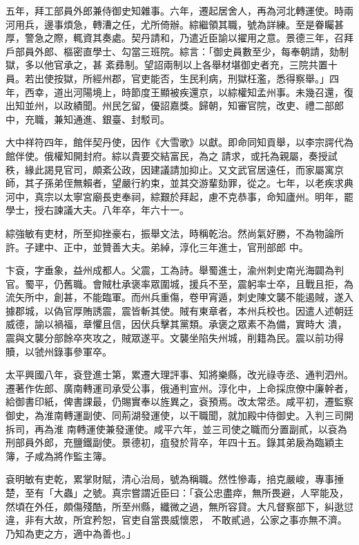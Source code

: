 \begin{pinyinscope}
 五年，拜工部員外郎兼侍御史知雜事。六年，遷起居舍人，再為河北轉運使。時兩河用兵，邊事煩急，轉漕之任，尤所倚辦。綜繼領其職，號為詳練。至是眷矚甚厚，警急之際，輒資其奏處。契丹請和，乃遣近臣諭以擢用之意。景德三年，召拜戶部員外郎、樞密直學士、勾當三班院。綜言：「御史員數至少，每奉朝請，劾制獄，多以他官承之，甚
 紊彞制。望詔兩制以上各舉材堪御史者充，三院共置十員。若出使按獄，所經州郡，官吏能否，生民利病，刑獄枉濫，悉得察舉。」四年，西幸，道出河陽境上，時節度王顯被疾還京，以綜權知孟州事。未幾召還，復出知並州，以政績聞。州民乞留，優詔嘉獎。歸朝，知審官院，改吏、禮二部郎中，充職，兼知通進、銀臺、封駁司。



 大中祥符四年，館伴契丹使，因作《大雪歌》以獻。即命同知貢舉，以李宗諤代為館伴使。俄權知開封府。綜以貴要交結富民，為之
 請求，或托為親屬，奏授試秩，緣此謁見官司，頗紊公政，因建議請加抑止。又文武官居遠任，而家屬寓京師，其子孫弟侄無賴者，望嚴行約束，並其交游輩劾罪，從之。七年，以老疾求典河中，真宗以太寧宮廟長吏奉祠，綜艱於拜起，慮不克恭事，命知廬州。明年，罷學士，授右諫議大夫。八年卒，年六十一。



 綜強敏有吏材，所至抑挫豪右，振舉文法，時稱乾治。然尚氣好勝，不為物論所許。子建中、正中，並贊善大夫。弟綽，淳化三年進士，官刑部郎
 中。



 卞袞，字垂象，益州成都人。父震，工為詩。舉蜀進士，渝州刺史南光海闢為判官。蜀平，仍舊職。會賊杜承褒率眾圍城，援兵不至，震躬率士卒，且戰且拒，為流矢所中，創甚，不能臨軍。而州兵重傷，卷甲宵遁，刺史陳文襲不能遏賊，遂入據郡城，以偽官厚賄誘震，震皆斬其使。賊有東章者，本州兵校也。因遣人述朝廷威德，諭以禍福，章懼且信，因伏兵擊其黨類。承褒之眾素不為備，實時大
 潰，震與文襲分部餘卒夾攻之，賊眾遂平。文襲坐陷失州城，削籍為民。震以前功得贖，以虢州錄事參軍卒。



 太平興國八年，袞登進士第，累遷大理評事、知將樂縣，改光祿寺丞、通判泗州。遷著作佐郎、廣南轉運司承受公事，俄通判宣州。淳化中，上命採庶僚中廉幹者，給御書印紙，俾書課最，仍賜實奉以旌異之，袞預焉。改太常丞。咸平初，遷監察御史，為淮南轉運副使、同荊湖發運使，以干職聞，就加殿中侍御史。入判三司開拆司，再為淮
 南轉運使兼發運使。咸平六年，並三司使之職而分置副貳，以袞為刑部員外郎，充鹽鐵副使。景德初，疽發於背卒，年四十五。錄其弟扆為臨穎主簿，子咸為將作監主簿。



 袞明敏有吏乾，累掌財賦，清心治局，號為稱職。然性慘毒，掊克嚴峻，專事捶楚，至有「大蟲」之號。真宗嘗謂近臣曰：「袞公忠盡瘁，無所畏避，人罕能及，然頃在外任，頗傷殘酷，所至州縣，纖微之過，無所容貸。大凡督察部下，糾逖愆違，非有大故，所宜矜恕，官吏自當畏威懷恩，
 不敢貳過，公家之事亦無不濟。乃知為吏之方，適中為善也。」




\end{pinyinscope}
